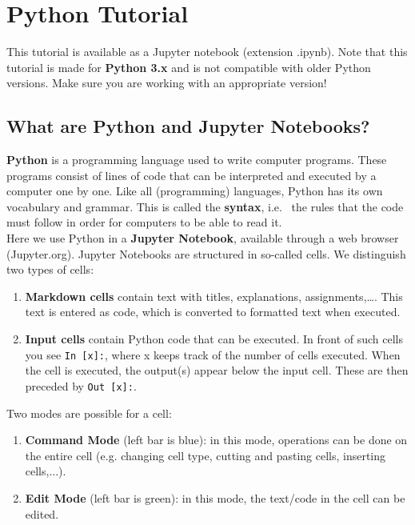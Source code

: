 \chapter{Python Tutorial}
\label{PythonTutorial}
\graphicspath{{figures/Python/}}
 This tutorial is available as a Jupyter notebook (extension .ipynb). Note that this tutorial is made for \textbf{Python 3.x} and is not compatible with older Python versions. Make sure you are working with an appropriate version!

\section{What are Python and Jupyter Notebooks?}
\textbf{Python} is a programming language used to write computer programs. These programs consist of lines of code that can be interpreted and executed by a computer one by one. Like all (programming) languages, Python has its own vocabulary and grammar. This is called the \textbf{syntax}, i.e. \ the rules that the code must follow in order for computers to be able to read it. \\

Here we use Python in a \textbf{Jupyter Notebook}, available through a web browser (Jupyter.org). Jupyter Notebooks are structured in so-called cells. We distinguish two types of cells: 

\begin{enumerate}
	\item \textbf{Markdown cells} contain text with titles, explanations, assignments,\ldots . This text is entered as code, which is converted to formatted text when executed.
	
	\item \textbf{Input cells} contain Python code that can be executed. In front of such cells you see \lstinline|In [x]:|, where x keeps track of the number of cells executed. When the cell is executed, the output(s) appear below the input cell. These are then preceded by \lstinline|Out [x]:|.
\end{enumerate}

Two modes are possible for a cell:

\begin{enumerate}
	\item \textbf{Command Mode} (left bar is blue): in this mode, operations can be done on the entire cell (e.g. changing cell type, cutting and pasting cells, inserting cells,...).
	
	\item \textbf{Edit Mode} (left bar is green): in this mode, the text/code in the cell can be edited.
\end{enumerate}

